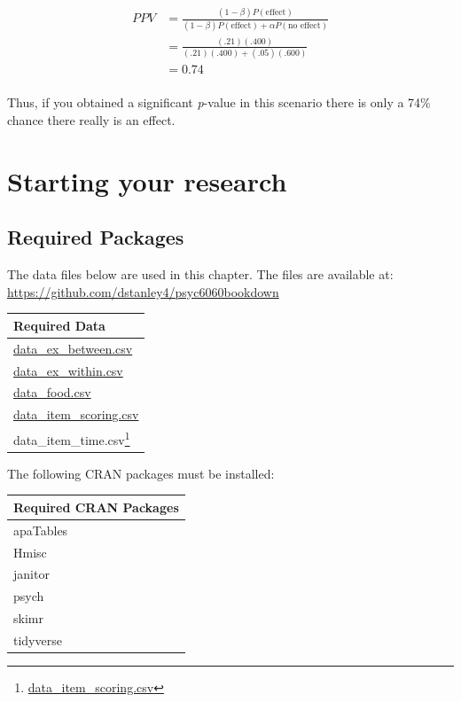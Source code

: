 \documentclass[
]{krantz}
\renewcommand{\href}[2]{#2\footnote{\url{#1}}}
\begin{document}
\[
\begin{aligned}
PPV &= \frac{(1 - \beta)P(\text{effect})}{(1 - \beta)P(\text{effect}) + \alpha P(\text{no effect})}\\
&= \frac{(.21)(.400)}{(.21)(.400) + (.05)(.600)}\\
&= 0.74\\
\end{aligned}
\]

Thus, if you obtained a significant \emph{p}-value in this scenario there is only a 74\% chance there really is an effect.

\hypertarget{starting-your-research}{%
\chapter{Starting your research}\label{starting-your-research}}

\hypertarget{required-packages}{%
\section{Required Packages}\label{required-packages}}

The data files below are used in this chapter. The files are available at: \url{https://github.com/dstanley4/psyc6060bookdown}

\begin{longtable}[]{@{}l@{}}
\toprule
Required Data \\
\midrule
\endhead
\url{data_ex_between.csv} \\
\url{data_ex_within.csv} \\
\url{data_food.csv} \\
\url{data_item_scoring.csv} \\
\href{data_item_scoring.csv}{data\_item\_time.csv} \\
\bottomrule
\end{longtable}

The following CRAN packages must be installed:

\begin{longtable}[]{@{}l@{}}
\toprule
Required CRAN Packages \\
\midrule
\endhead
apaTables \\
Hmisc \\
janitor \\
psych \\
skimr \\
tidyverse \\
\bottomrule
\end{longtable}
\end{document}
